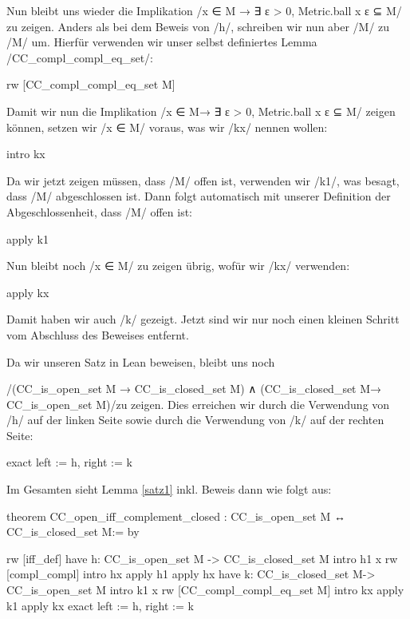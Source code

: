 \documentclass[10pt]{article}
\begin{document}
\noindent Nun bleibt uns wieder die Implikation \lean/x ∈ M → ∃ ε > 0, Metric.ball x ε ⊆ M/ zu zeigen. Anders als bei dem Beweis von \lean/h/, schreiben wir nun aber \lean/M/ zu \lean/M\compl\compl/ um. Hierfür verwenden wir unser selbst definiertes Lemma \lean/CC_compl\_compl\_eq\_set/:
\begin{leancode}
  rw [CC_compl_compl_eq_set M] 
\end{leancode}
\noindent Damit wir nun die Implikation \lean/x ∈ M\compl\compl → ∃ ε > 0, Metric.ball x ε ⊆ M\compl\compl/ zeigen können, setzen wir \lean/x ∈ M\compl\compl/ voraus, was wir \lean/kx/ nennen wollen:
\begin{leancode}
  intro kx
\end{leancode}
\noindent Da wir jetzt zeigen müssen, dass \lean/M\compl\compl/ offen ist, verwenden wir \lean/k1/, was besagt, dass \lean/M\compl/ abgeschlossen ist. Dann folgt automatisch mit unserer Definition der Abgeschlossenheit, dass \lean/M\compl\compl/ offen ist:
\begin{leancode}
  apply k1
\end{leancode}
\noindent Nun bleibt noch \lean/x ∈ M\compl\compl/ zu zeigen übrig, wofür wir \lean/kx/ verwenden:
\begin{leancode}
  apply kx 
\end{leancode}
\noindent Damit haben wir auch \lean/k/ gezeigt. Jetzt sind wir nur noch einen kleinen Schritt vom Abschluss des Beweises entfernt.\par

\noindent Da wir unseren Satz in Lean beweisen, bleibt uns noch\par

\noindent \lean/(CC_is_open_set M → CC_is_closed_set M\compl) ∧ (CC_is_closed_set M\compl → CC_is_open_set M)/zu zeigen. Dies erreichen wir durch die Verwendung von \lean/h/ auf der linken Seite sowie durch die Verwendung von \lean/k/ auf der rechten Seite:
\begin{leancode}
  exact { left := h, right := k }
\end{leancode}
\noindent Im Gesamten sieht Lemma \ref{satz1} inkl. Beweis dann wie folgt aus:
\begin{leancode}
theorem CC_open_iff_complement_closed :
  CC_is_open_set M ↔ CC_is_closed_set M\compl := by

  rw [iff_def]
  have h: CC_is_open_set M -> CC_is_closed_set M\compl 
  intro h1 x
  rw [compl_compl]
  intro hx
  apply h1
  apply hx
  have k: CC_is_closed_set M\compl -> CC_is_open_set M
  intro k1 x
  rw [CC_compl_compl_eq_set M] 
  intro kx
  apply k1
  apply kx
  exact { left := h, right := k }
\end{leancode}
\end{document}
